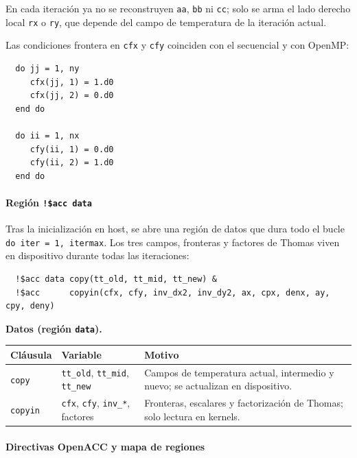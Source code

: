 \documentclass[11pt,a4paper]{article}
\begin{document}
En cada iteraci\'on ya no se reconstruyen \texttt{aa}, \texttt{bb} ni
\texttt{cc}; solo se arma el lado derecho local \texttt{rx} o \texttt{ry}, que
depende del campo de temperatura de la iteraci\'on actual.

Las condiciones frontera en \texttt{cfx} y \texttt{cfy} coinciden con el
secuencial y con OpenMP:

\begin{verbatim}
  do jj = 1, ny
     cfx(jj, 1) = 1.d0
     cfx(jj, 2) = 0.d0
  end do

  do ii = 1, nx
     cfy(ii, 1) = 0.d0
     cfy(ii, 2) = 1.d0
  end do
\end{verbatim}

\paragraph{Regi\'on \texttt{!\$acc data}}

\medskip

Tras la inicializaci\'on en host, se abre una regi\'on de datos que dura todo el
bucle \texttt{do iter = 1, itermax}. Los tres campos, fronteras y factores de
Thomas viven en dispositivo durante todas las iteraciones:

\begin{verbatim}
  !$acc data copy(tt_old, tt_mid, tt_new) &
  !$acc      copyin(cfx, cfy, inv_dx2, inv_dy2, ax, cpx, denx, ay, cpy, deny)
\end{verbatim}

\noindent\textbf{Datos (regi\'on \texttt{data}).}
\begin{center}
\small
\begin{tabular}{lll}
\hline
Cl\'ausula & Variable & Motivo \\
\hline
\texttt{copy} & \texttt{tt\_old}, \texttt{tt\_mid}, \texttt{tt\_new} &
Campos de temperatura actual, intermedio y nuevo; se actualizan en dispositivo. \\
\texttt{copyin} & \texttt{cfx}, \texttt{cfy}, \texttt{inv\_*}, factores &
Fronteras, escalares y factorizaci\'on de Thomas; solo lectura en kernels. \\
\hline
\end{tabular}
\end{center}

\paragraph{Directivas OpenACC y mapa de regiones}
\end{document}
